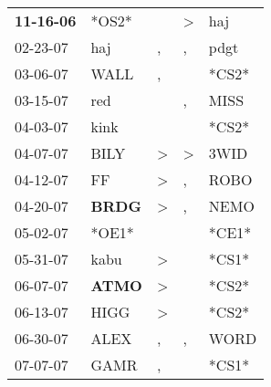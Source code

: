 \begin{supertabular}{p{0.07\textwidth}p{0.06\textwidth}p{0.02\textwidth}p{0.02\textwidth}p{0.06\textwidth}}
 \textbf{11-16-06\textsuperscript{}} &                            *OS2* &                  &     \textgreater &            haj\textsuperscript{} \\
          02-23-07\textsuperscript{} &            haj\textsuperscript{} &                , &                , &           pdgt\textsuperscript{} \\
          03-06-07\textsuperscript{} &           WALL\textsuperscript{} &                , &                  &                            *CS2* \\
          03-15-07\textsuperscript{} &            red\textsuperscript{} &                  &                , &           MISS\textsuperscript{} \\
          04-03-07\textsuperscript{} &           kink\textsuperscript{} &                  &                  &                            *CS2* \\
          04-07-07\textsuperscript{} &           BILY\textsuperscript{} &     \textgreater &     \textgreater &           3WID\textsuperscript{} \\
          04-12-07\textsuperscript{} &             FF\textsuperscript{} &     \textgreater &                , &           ROBO\textsuperscript{} \\
          04-20-07\textsuperscript{} &  \textbf{BRDG\textsuperscript{}} &     \textgreater &                , &           NEMO\textsuperscript{} \\
          05-02-07\textsuperscript{} &                            *OE1* &                  &                  &                            *CE1* \\
          05-31-07\textsuperscript{} &           kabu\textsuperscript{} &     \textgreater &                  &                            *CS1* \\
          06-07-07\textsuperscript{} &  \textbf{ATMO\textsuperscript{}} &     \textgreater &                  &                            *CS2* \\
          06-13-07\textsuperscript{} &           HIGG\textsuperscript{} &     \textgreater &                  &                            *CS2* \\
          06-30-07\textsuperscript{} &           ALEX\textsuperscript{} &                , &                , &           WORD\textsuperscript{} \\
          07-07-07\textsuperscript{} &           GAMR\textsuperscript{} &                , &                  &                            *CS1* \\

\end{supertabular}
